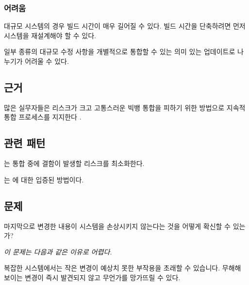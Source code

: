 \documentclass[a4paper,10pt,twoside]{book}
\begin{document}
\subsubsection*{어려움}

\begin{bulletlist}
\item 대규모 시스템의 경우 빌드 시간이 매우 길어질 수 있다. 빌드 시간을 단축하려면 먼저 시스템을 재설계해야 할 수 있다.

\item 일부 종류의 대규모 수정 사항을 개별적으로 통합할 수 있는 의미 있는 업데이트로 나누기가 어려울 수 있다.
\end{bulletlist}

\subsection*{근거}

많은 실무자들은 리스크가 크고 고통스러운 빅뱅 통합을 피하기 위한 방법으로 지속적 통합 프로세스를 지지한다 \cite{Booc94a}.

\subsection*{관련 패턴}

는 통합 중에 결함이 발생할 리스크를 최소화한다.

 \cite{Booc94a} \cite{Beck00a}는 에 대한 입증된 방법이다.




\subsection*{문제}

마지막으로 변경한 내용이 시스템을 손상시키지 않는다는 것을 어떻게 확신할 수 있는가?

\emph{이 문제는 다음과 같은 이유로 어렵다.}

\begin{bulletlist}
\item 복잡한 시스템에서는 작은 변경이 예상치 못한 부작용을 초래할 수 있습니다. 무해해 보이는 변경이 즉시 발견되지 않고 무언가를 망가뜨릴 수 있다.
\end{bulletlist}
\end{document}
